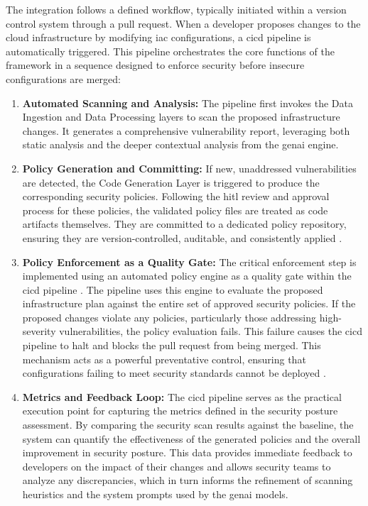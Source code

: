 The integration follows a defined workflow, typically initiated within a version control system through a pull request. When a developer proposes changes to the cloud infrastructure by modifying \gls{iac} configurations, a \gls{cicd} pipeline is automatically triggered. This pipeline orchestrates the core functions of the framework in a sequence designed to enforce security before insecure configurations are merged:

\begin{enumerate}
\item \textbf{Automated Scanning and Analysis:} The pipeline first invokes the Data Ingestion and Data Processing layers to scan the proposed infrastructure changes. It generates a comprehensive vulnerability report, leveraging both static analysis and the deeper contextual analysis from the \gls{genai} engine.
\item \textbf{Policy Generation and Committing:} If new, unaddressed vulnerabilities are detected, the Code Generation Layer is triggered to produce the corresponding security policies. Following the \gls{hitl} review and approval process for these policies, the validated policy files are treated as code artifacts themselves. They are committed to a dedicated policy repository, ensuring they are version-controlled, auditable, and consistently applied \cite{sarathe_krisshnan_jutoo_vijayaraghavan_policy_2025}.
\item \textbf{Policy Enforcement as a Quality Gate:} The critical enforcement step is implemented using an automated policy engine as a quality gate within the \gls{cicd} pipeline \cite{noauthor_streamlining_nodate}. The pipeline uses this engine to evaluate the proposed infrastructure plan against the entire set of approved security policies. If the proposed changes violate any policies, particularly those addressing high-severity vulnerabilities, the policy evaluation fails. This failure causes the \gls{cicd} pipeline to halt and blocks the pull request from being merged. This mechanism acts as a powerful preventative control, ensuring that configurations failing to meet security standards cannot be deployed \cite{sarathe_krisshnan_jutoo_vijayaraghavan_policy_2025} \cite{noauthor_streamlining_nodate}.
\item \textbf{Metrics and Feedback Loop:} The \gls{cicd} pipeline serves as the practical execution point for capturing the metrics defined in the security posture assessment. By comparing the security scan results against the baseline, the system can quantify the effectiveness of the generated policies and the overall improvement in security posture. This data provides immediate feedback to developers on the impact of their changes and allows security teams to analyze any discrepancies, which in turn informs the refinement of scanning heuristics and the system prompts used by the \gls{genai} models.
\end{enumerate}

